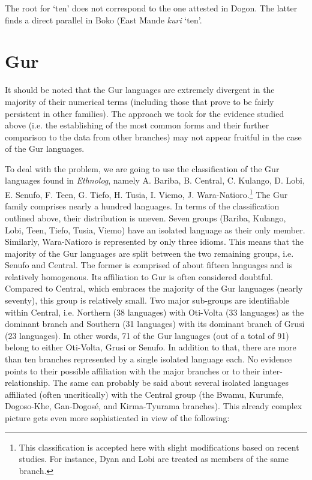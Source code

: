 The root for ‘ten’ does not correspond to the one attested in Dogon. The latter finds a direct parallel in Boko (East Mande \textit{kuri} ‘ten’.

\section{Gur}%

It should be noted that the Gur languages are extremely divergent in the majority of their numerical terms (including those that prove to be fairly persistent in other families). The approach we took for the evidence studied above (i.e. the establishing of the most common forms and their further comparison to the data from other branches) may not appear fruitful in the case of the Gur languages.

To deal with the problem, we are going to use the classification of the Gur languages found in \textit{Ethnolog}, namely A. Bariba, B. Central, C. Kulango, D. Lobi, E. Senufo, F. Teen, G. Tiefo, H. Tusia, I. Viemo, J. Wara-Natioro.\footnote{This classification is accepted here with slight modifications based on recent studies. For instance, Dyan and Lobi  are treated as members of the same branch.} The Gur family comprises nearly a hundred languages. In terms of the classification outlined above, their distribution is uneven. Seven groups (Bariba, Kulango, Lobi, Teen, Tiefo, Tusia, Viemo) have an isolated language as their only member. Similarly, Wara-Natioro is represented by only three idioms. This means that the majority of the Gur languages are split between the two remaining groups, i.e. Senufo and Central. The former is comprised of about fifteen languages and is relatively homogenous. Its affiliation to Gur is often considered doubtful. Compared to Central, which embraces the majority of the Gur languages (nearly seventy), this group is relatively small. Two major sub-groups are identifiable within Central, i.e. Northern (38 languages) with Oti-Volta (33 languages) as the dominant branch and Southern (31 languages) with its dominant branch of Grusi (23 languages). In other words, 71 of the Gur languages (out of a total of 91) belong to either Oti-Volta, Grusi or Senufo. In addition to that, there are more than ten branches represented by a single isolated language each. No evidence points to their possible affiliation with the major branches or to their inter-relationship. The same can probably be said about several isolated languages affiliated (often uncritically) with the Central group (the Bwamu, Kurumfe, Dogoso-Khe, Gan-Dogosé, and Kirma-Tyurama branches). This already complex picture gets even more sophisticated in view of the following: 

